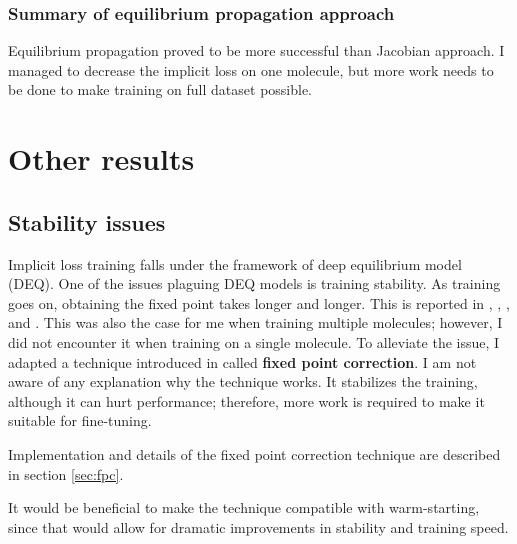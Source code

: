 \documentclass[a4paper,10pt]{report}
\begin{document}
\subsubsection{Summary of equilibrium propagation approach}
Equilibrium propagation proved to be more successful than Jacobian approach. I managed to decrease the implicit loss on one molecule, but more work needs to be done to make training on full dataset possible.
\section{Other results}

\subsection{Stability issues}
Implicit loss training falls under the framework of deep equilibrium model (DEQ). One of the issues plaguing DEQ models is training stability. As training goes on, obtaining the fixed point takes longer and longer. This is reported in \cite{opticalflow}, \cite{bai2021stabilizing}, \cite{burger2025dequify}, and \cite{geng2023torchdeq}. This was also the case for me when training multiple molecules; however, I did not encounter it when training on a single molecule. To alleviate the issue, I adapted a technique introduced in \cite{opticalflow} called \textbf{fixed point correction}. I am not aware of any explanation why the technique works. It stabilizes the training, although it can hurt performance; therefore, more work is required to make it suitable for fine-tuning.

Implementation and details of the fixed point correction technique are described in section \ref{sec:fpc}.

It would be beneficial to make the technique compatible with warm-starting, since that would allow for dramatic improvements in stability and training speed.
\end{document}
